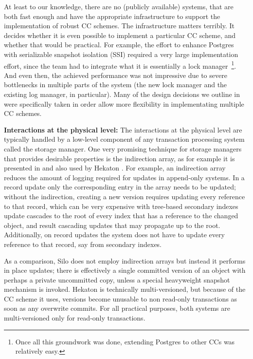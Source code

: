 At least to our knowledge, there are no (publicly available) systems, that are both fast enough and have the appropriate infrastructure to support the implementation of robust CC schemes. The infrastructure matters terribly. It decides whether it is even possible to implement a particular CC scheme, and whether that would be practical. For example, the effort to enhance Postgres with serializable snapshot isolation (SSI) required a very large implementation effort, since the team had to integrate what it is essentially a lock manager~\footnote{Once all this groundwork was done, extending Postgres to other CCs was relatively easy.}. And even then, the achieved performance was not impressive due to severe bottlenecks in multiple parts of the system (the new lock manager and the existing log manager, in particular). Many of the design decisions we outline in  were specifically taken in order allow more flexibility in implementating multiple CC schemes.

\vspace{2mm}
{\bf Interactions at the physical level:} 
The interactions at the physical level are typically handled by a low-level component of any transaction processing system called the storage manager. 
One very promising technique for storage managers that provides desirable properties is the indirection array, as for example it is presented in \cite{SadoghiRCB13} and also used by Hekaton \cite{Diaconu+13}.
For example, an indirection array reduces the amount of logging required for updates in append-only systems. In a record update only the corresponding entry in the array needs to be updated; without the indirection, creating a new version requires updating every reference to that record, which can be very expensive with tree-based secondary indexes update cascades to the root of every index that has a reference to the changed object, and  result cascading updates that may propagate up to the root. Additionally, on record updates the system does not have to update every reference to that record, say from secondary indexes.

As a comparison, Silo does not employ indirection arrays but instead it performs in place updates; there is effectively a single committed version of an object with perhaps a private uncommitted copy, unless a special heavyweight snapshot mechanism is invoked. Hekaton is technically multi-versioned, but because of the CC scheme it uses, versions become unusable to non read-only transactions as soon as any overwrite commits. For all practical purposes, both systems are multi-versioned only for read-only transactions.

